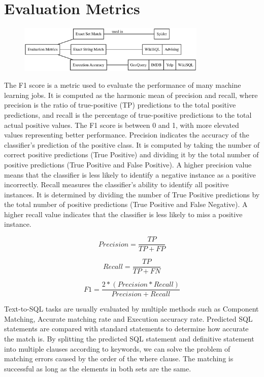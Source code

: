 \section{Evaluation Metrics} \label{eval}

\begin{figure}[H]
    \centering
    \includegraphics[width=0.8\textwidth]{pics/mindmap/eval/eval.eps}
    \label{fig:evals}
\end{figure}


The F1 score is a metric used to evaluate the performance of many machine learning jobs. It is computed as the harmonic mean of precision and recall, where precision is the ratio of true-positive (TP) predictions to the total positive predictions, and recall is the percentage of true-positive predictions to the total actual positive values. The F1 score is between 0 and 1, with more elevated values representing better performance.
Precision indicates the accuracy of the classifier's prediction of the positive class. It is computed by taking the number of correct positive predictions (True Positive) and dividing it by the total number of positive predictions (True Positive and False Positive). A higher precision value means that the classifier is less likely to identify a negative instance as a positive incorrectly.
Recall measures the classifier's ability to identify all positive instances. It is determined by dividing the number of True Positive predictions by the total number of positive predictions (True Positive and False Negative). A higher recall value indicates that the classifier is less likely to miss a positive instance.

\begin{equation}
    Precision = \frac{TP}{TP + FP}
\end{equation}

\begin{equation}
    Recall = \frac{TP}{TP + FN}
\end{equation}

\begin{equation}
    F1 = \frac{2 * (Precision * Recall)}{Precision + Recall}
\end{equation}

Text-to-SQL tasks are usually evaluated by multiple methods such as Component Matching, Accurate matching rate and Execution accuracy rate. Predicted SQL statements are compared with standard statements to determine how accurate the match is.
By splitting the predicted SQL statement and definitive statement into multiple clauses according to keywords, we can solve the problem of matching errors caused by the order of the where clause. The matching is successful as long as the elements in both sets are the same.

